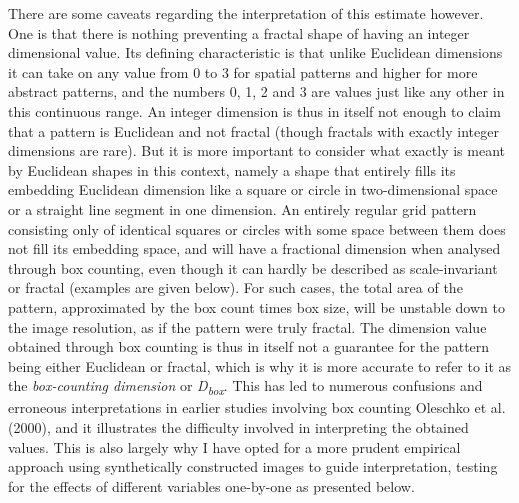 \documentclass[
  12pt,
  a4paper, twoside]{book}
\begin{document}
There are some caveats regarding the interpretation of this estimate however. One is that there is nothing preventing a fractal shape of having an integer dimensional value. Its defining characteristic is that unlike Euclidean dimensions it can take on any value from 0 to 3 for spatial patterns and higher for more abstract patterns, and the numbers 0, 1, 2 and 3 are values just like any other in this continuous range. An integer dimension is thus in itself not enough to claim that a pattern is Euclidean and not fractal (though fractals with exactly integer dimensions are rare). But it is more important to consider what exactly is meant by Euclidean shapes in this context, namely a shape that entirely fills its embedding Euclidean dimension like a square or circle in two-dimensional space or a straight line segment in one dimension. An entirely regular grid pattern consisting only of identical squares or circles with some space between them does not fill its embedding space, and will have a fractional dimension when analysed through box counting, even though it can hardly be described as scale-invariant or fractal (examples are given below). For such cases, the total area of the pattern, approximated by the box count times box size, will be unstable down to the image resolution, as if the pattern were truly fractal. The dimension value obtained through box counting is thus in itself not a guarantee for the pattern being either Euclidean or fractal, which is why it is more accurate to refer to it as the \emph{box-counting dimension} or \emph{D\textsubscript{box}}. This has led to numerous confusions and erroneous interpretations in earlier studies involving box counting Oleschko et al. (2000), and it illustrates the difficulty involved in interpreting the obtained values. This is also largely why I have opted for a more prudent empirical approach using synthetically constructed images to guide interpretation, testing for the effects of different variables one-by-one as presented below.
\end{document}
